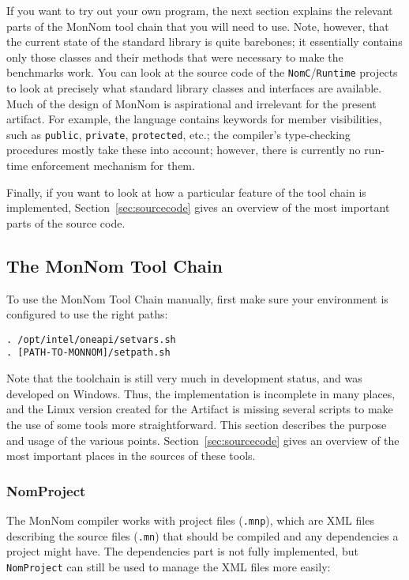\documentclass{article}
\newcommand{\refsec}[1]{Section~\ref{sec:#1}}
\begin{document}
If you want to try out your own program, the next section explains the relevant parts of the MonNom tool chain that you will need to use.
Note, however, that the current state of the standard library is quite barebones; it essentially contains only those classes and their methods that were necessary to make the benchmarks work.
You can look at the source code of the \texttt{NomC}/\texttt{Runtime} projects to look at precisely what standard library classes and interfaces are available.
Much of the design of MonNom is aspirational and irrelevant for the present artifact.
For example, the language contains keywords for member visibilities, such as \texttt{public}, \texttt{private}, \texttt{protected}, etc.; the compiler's type-checking procedures mostly take these into account; however, there is currently no run-time enforcement mechanism for them.

Finally, if you want to look at how a particular feature of the tool chain is implemented, \refsec{sourcecode} gives an overview of the most important parts of the source code.

\subsection{The MonNom Tool Chain}
\label{sec:toolchain}
To use the MonNom Tool Chain manually, first make sure your environment is configured to use the right paths:
\begin{verbatim}
. /opt/intel/oneapi/setvars.sh
. [PATH-TO-MONNOM]/setpath.sh
\end{verbatim}

Note that the toolchain is still very much in development status, and was developed on Windows.
Thus, the implementation is incomplete in many places, and the Linux version created for the Artifact is missing several scripts to make the use of some tools more straightforward.
This section describes the purpose and usage of the various points. \refsec{sourcecode} gives an overview of the most important places in the sources of these tools.

\subsubsection{NomProject}
\label{sec:nomproject}
The MonNom compiler works with project files (\texttt{.mnp}), which are XML files describing the source files (\texttt{.mn}) that should be compiled and any dependencies a project might have. 
The dependencies part is not fully implemented, but \texttt{NomProject} can still be used to manage the XML files more easily:
\end{document}
